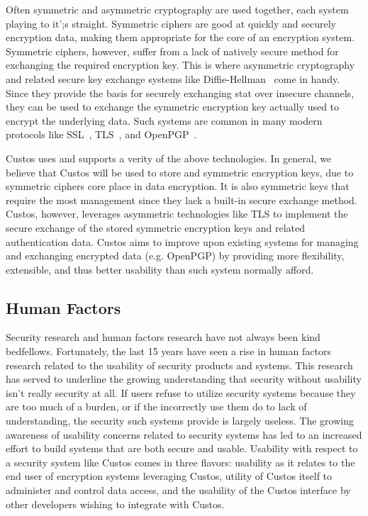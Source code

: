 Often symmetric and asymmetric cryptography are used together, each
system playing to it';s straight. Symmetric ciphers are good at
quickly and securely encryption data, making them appropriate for the
core of an encryption system. Symmetric ciphers, however, suffer from
a lack of natively secure method for exchanging the required
encryption key. This is where asymmetric cryptography and related
secure key exchange systems like Diffie-Hellman~\cite{Diffie1976} come
in handy. Since they provide the basis for securely exchanging stat
over insecure channels, they can be used to exchange the symmetric
encryption key actually used to encrypt the underlying data. Such
systems are common in many modern protocols like
SSL~\cite{Freier2011}, TLS~\cite{Dierks2008}, and
OpenPGP~\cite{Callas2007}.

Custos uses and supports a verity of the above technologies. In
general, we believe that Custos will be used to store and symmetric
encryption keys, due to symmetric ciphers core place in data
encryption. It is also symmetric keys that require the most management
since they lack a built-in secure exchange method. Custos, however,
leverages asymmetric technologies like TLS to implement the secure
exchange of the stored symmetric encryption keys and related
authentication data. Custos aims to improve upon existing systems for
managing and exchanging encrypted data (e.g. OpenPGP) by providing
more flexibility, extensible, and thus better usability than such
system normally afford.


\subsection{Human Factors}

Security research and human factors research have not always been kind
bedfellows. Fortunately, the last 15 years have seen a rise in human
factors research related to the usability of security products and
systems. This research has served to underline the growing
understanding that security without usability isn't really security at
all. If users refuse to utilize security systems because they are too
much of a burden, or if the incorrectly use them do to lack of
understanding, the security such systems provide is largely
useless. The growing awareness of usability concerns related to
security systems has led to an increased effort to build systems that
are both secure and usable. Usability with respect to a security
system like Custos comes in three flavors: usability as it relates to
the end user of encryption systems leveraging Custos, utility of
Custos itself to administer and control data access, and the usability
of the Custos interface by other developers wishing to integrate with
Custos.

